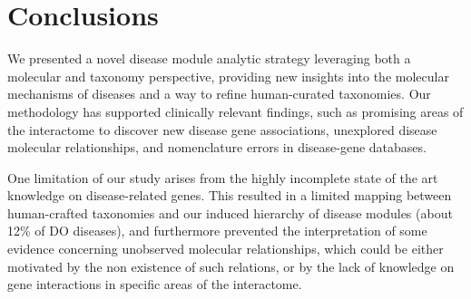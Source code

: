 \documentclass[journal,twoside,web]{ieeecolor}
\begin{document}
\section{Conclusions}
\label{conclusions}

We presented a novel disease module analytic strategy leveraging both a molecular and  taxonomy perspective, providing new insights into the molecular mechanisms of diseases and a  way to refine  human-curated taxonomies. Our methodology has supported clinically relevant findings, such as promising areas of the interactome to discover new  disease gene associations, unexplored disease molecular relationships, and nomenclature errors in disease-gene databases.

One limitation of our study arises from the highly incomplete state of the art  knowledge on disease-related genes. This resulted in a limited mapping between human-crafted taxonomies and our induced hierarchy of disease modules (about 12\% of DO diseases), and furthermore prevented the interpretation of some evidence concerning unobserved molecular relationships, which could be either motivated by the non existence of such relations, or by the lack of knowledge on gene interactions in specific areas of the interactome.   



\end{document}
